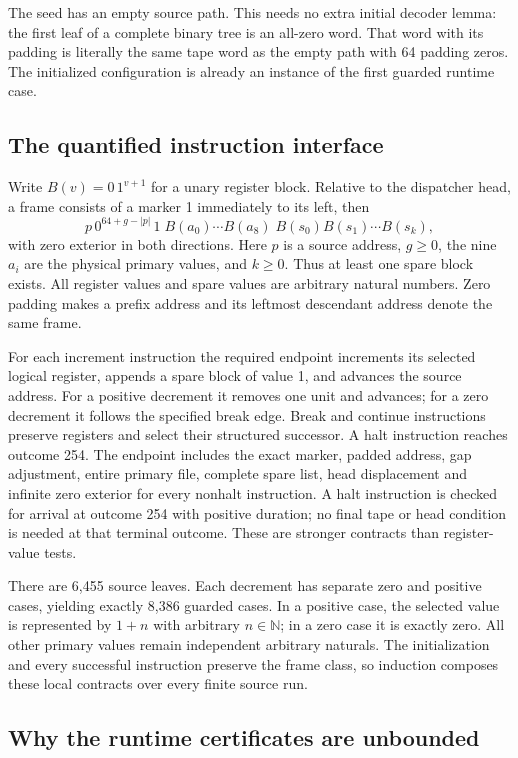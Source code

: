 The seed has an empty source path. This needs no extra initial decoder
lemma: the first leaf of a complete binary tree is an all-zero word.
That word with its padding is literally the same tape word as the empty
path with 64 padding zeros. The initialized configuration is already an
instance of the first guarded runtime case.

\subsection{The quantified instruction interface}

Write $B(v)=0\,1^{v+1}$ for a unary register block. Relative to the
dispatcher head, a frame consists of a marker 1 immediately to its left,
then
\[
 p\,0^{64+g-|p|}\,1\;
 B(a_0)\cdots B(a_8)\;B(s_0)B(s_1)\cdots B(s_k),
\]
with zero exterior in both directions. Here $p$ is a source address,
$g\ge0$, the nine $a_i$ are the physical primary values, and $k\ge0$.
Thus at least one spare block exists. All register values and spare
values are arbitrary natural numbers. Zero padding makes a prefix
address and its leftmost descendant address denote the same frame.

For each increment instruction the required endpoint increments its
selected logical register, appends a spare block of value 1, and advances
the source address. For a positive decrement it removes one unit and
advances; for a zero decrement it follows the specified break edge.
Break and continue instructions preserve registers and select their
structured successor. A halt instruction reaches outcome 254. The
endpoint includes the exact marker, padded address, gap adjustment,
entire primary file, complete spare list, head displacement and infinite
zero exterior for every nonhalt instruction. A halt instruction is checked
for arrival at outcome 254 with positive duration; no final tape or head
condition is needed at that terminal outcome. These are stronger contracts
than register-value tests.

There are 6,455 source leaves. Each decrement has separate zero and
positive cases, yielding exactly 8,386 guarded cases. In a positive
case, the selected value is represented by $1+n$ with arbitrary
$n\in\mathbb N$; in a zero case it is exactly zero. All other primary
values remain independent arbitrary naturals. The initialization and
every successful instruction preserve the frame class, so induction
composes these local contracts over every finite source run.

\subsection{Why the runtime certificates are unbounded}

